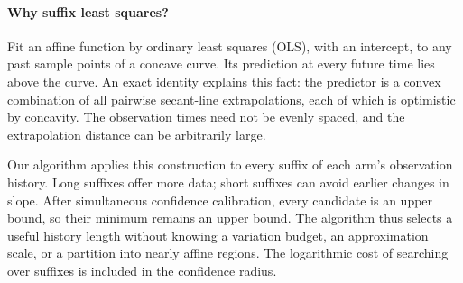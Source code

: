 \documentclass[11pt]{article}
\theoremstyle{remark}
\begin{document}
\paragraph{Why suffix least squares?}
Fit an affine function by ordinary least squares (OLS), with an intercept, to any past sample points of a concave curve. Its prediction at every future time lies above the curve. An exact identity explains this fact: the predictor is a convex combination of all pairwise secant-line extrapolations, each of which is optimistic by concavity. The observation times need not be evenly spaced, and the extrapolation distance can be arbitrarily large.

Our algorithm applies this construction to every suffix of each arm's observation history. Long suffixes offer more data; short suffixes can avoid earlier changes in slope. After simultaneous confidence calibration, every candidate is an upper bound, so their minimum remains an upper bound. The algorithm thus selects a useful history length without knowing a variation budget, an approximation scale, or a partition into nearly affine regions. The logarithmic cost of searching over suffixes is included in the confidence radius.
\end{document}
